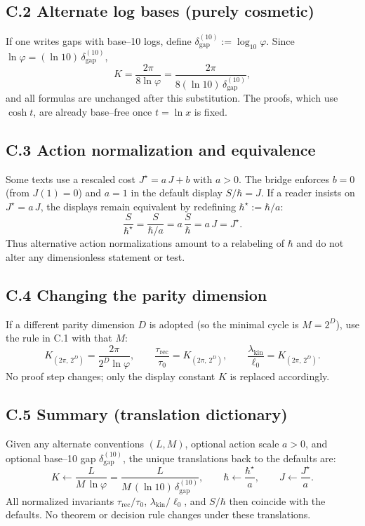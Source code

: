 \documentclass[11pt]{article}
\begin{document}
\subsection*{C.2 Alternate log bases (purely cosmetic)}
If one writes gaps with base–10 logs, define \(\delta_{\mathrm{gap}}^{(10)}:=\log_{10}\varphi\). Since \(\ln\varphi=(\ln 10)\,\delta_{\mathrm{gap}}^{(10)}\),
\[
K=\frac{2\pi}{8\ln\varphi}
=\frac{2\pi}{8(\ln 10)\,\delta_{\mathrm{gap}}^{(10)}},
\]
and all formulas are unchanged after this substitution. The proofs, which use \(\cosh t\), are already base–free once \(t=\ln x\) is fixed.

\subsection*{C.3 Action normalization and equivalence}
Some texts use a rescaled cost \(J^{\star}=a\,J+b\) with \(a>0\). The bridge enforces \(b=0\) (from \(J(1)=0\)) and \(a=1\) in the default display \(S/\hbar=J\). If a reader insists on \(J^{\star}=a\,J\), the displays remain equivalent by redefining \(\hbar^{\star}:=\hbar/a\):
\[
\frac{S}{\hbar^{\star}}=\frac{S}{\hbar/a}=a\,\frac{S}{\hbar}=a\,J=J^{\star}.
\]
Thus alternative action normalizations amount to a relabeling of \(\hbar\) and do not alter any dimensionless statement or test.

\subsection*{C.4 Changing the parity dimension}
If a different parity dimension \(D\) is adopted (so the minimal cycle is \(M=2^{D}\)), use the rule in C.1 with that \(M\):
\[
K_{(2\pi,\,2^{D})}=\frac{2\pi}{2^{D}\ln\varphi},\qquad
\frac{\tau_{\mathrm{rec}}}{\tau_{0}}=K_{(2\pi,\,2^{D})},\qquad
\frac{\lambda_{\mathrm{kin}}}{\ell_{0}}=K_{(2\pi,\,2^{D})}.
\]
No proof step changes; only the display constant \(K\) is replaced accordingly.

\subsection*{C.5 Summary (translation dictionary)}
Given any alternate conventions \((L,M)\), optional action scale \(a>0\), and optional base–10 gap \(\delta_{\mathrm{gap}}^{(10)}\), the unique translations back to the defaults are:
\[
K\leftarrow \frac{L}{M\,\ln\varphi}
=\frac{L}{M\,(\ln 10)\,\delta_{\mathrm{gap}}^{(10)}},\qquad
\hbar\leftarrow \frac{\hbar^{\star}}{a},\qquad
J\leftarrow \frac{J^{\star}}{a}.
\]
All normalized invariants \(\tau_{\mathrm{rec}}/\tau_{0}\), \(\lambda_{\mathrm{kin}}/\ell_{0}\), and \(S/\hbar\) then coincide with the defaults. No theorem or decision rule changes under these translations.
\end{document}
